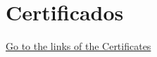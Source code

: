 \documentclass[letterpaper]{DS_class_file} %
\begin{document}
	
	

\section{Certificados}  {\hfill \href{https://github.com/maaferna/resume/tree/master/shared}{Go to the links  of the Certificates}}
\end{document}
